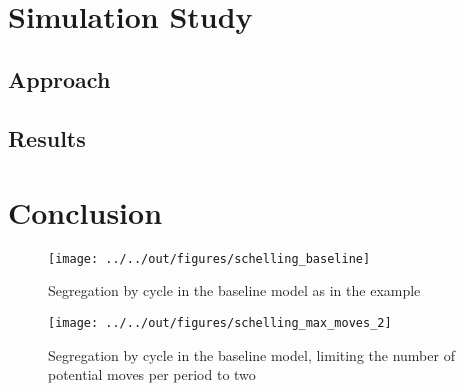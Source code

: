 \documentclass[11pt, a4paper, leqno]{article}
\begin{document}





 \(\) \(\) \(\) \(\) \(\) 


\section{Simulation Study} %
\label{sec:simulation}

\subsection{Approach} %
\label{sec:sim_approach}



\subsection{Results} %
\label{sec:sim_results}
    




\section{Conclusion} %
\label{sec:conclusion}




\begin{figure}
    \caption{Segregation by cycle in the baseline \citet{Schelling69} model as in the \citet{StachurskiSargent13} example}
    
    \texttt{[image: ../../out/figures/schelling\_baseline]}

\end{figure}


\begin{figure}
    \caption{Segregation by cycle in the baseline \citet{Schelling69} model, limiting the number of potential moves per period to two}
    
    \texttt{[image: ../../out/figures/schelling\_max\_moves\_2]}

\end{figure}


\pagebreak










\end{document}

